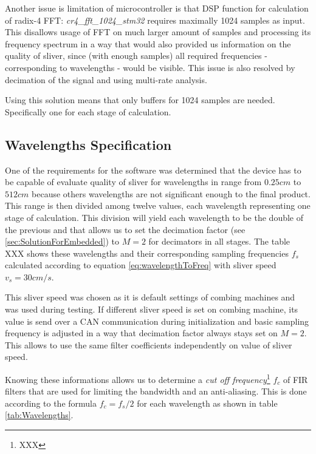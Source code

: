 \documentclass[twoside]{ctuthesis}
\theoremstyle{plain}
\theoremstyle{definition}
\theoremstyle{note}
\begin{document}
Another issue is limitation of microcontroller is that DSP function for calculation of radix-4 FFT: \textit{cr4\_fft\_1024\_stm32} requires maximally 1024 samples as input. This disallows usage of FFT on much larger amount of samples and processing its frequency spectrum in a way that would also provided us information on the quality of sliver, since (with enough samples) all required frequencies - corresponding to wavelengths - would be visible. This issue is also resolved by decimation of the signal and using multi-rate analysis. 

Using this solution means that only buffers for 1024 samples are needed. Specifically one for each stage of calculation.

\subsection{Wavelengths Specification}
One of the requirements for the software was determined that the device has to be capable of evaluate quality of sliver for wavelengths in range from $0.25 cm$ to $512 cm$ because others wavelengths are not significant enough to the final product. This range is then divided among twelve values, each wavelength representing one stage of calculation. This division will yield each wavelength to be the double of the previous and that allows us to set the decimation factor (see \ref{sec:SolutionForEmbedded}) to $M=2$ for decimators in all stages. The table XXX shows these wavelengths and their corresponding sampling frequencies $f_s$ calculated according to equation \ref{eq:wavelengthToFreq} with sliver speed $v_{s}=30 cm/s$. 

This sliver speed was chosen as it is default settings of combing machines and was used during testing. If different sliver speed is set on combing machine, its value is send over a CAN communication during initialization and basic sampling frequency is adjusted in a way that decimation factor always stays set on $M=2$. This allows to use the same filter coefficients independently on value of sliver speed.

Knowing these informations allows us to determine a \textit{cut off frequency}\footnote{XXX} $f_c$ of FIR filters that are used for limiting the bandwidth and an anti-aliasing. This is done according to the formula $f_c=f_s/2$ for each wavelength as shown in table \ref{tab:Wavelengths}.
\end{document}
